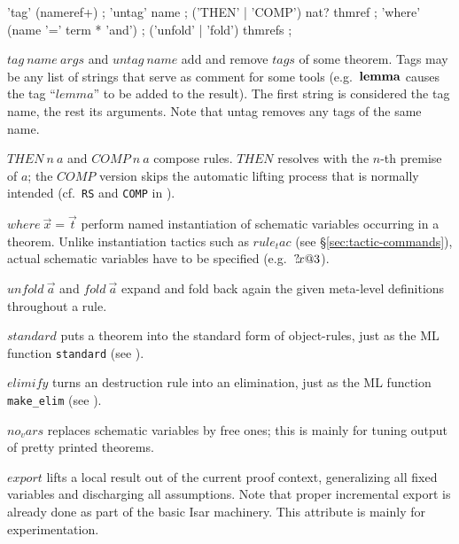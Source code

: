 \begin{rail}
  'tag' (nameref+)
  ;
  'untag' name
  ;
  ('THEN' | 'COMP') nat? thmref
  ;
  'where' (name '=' term * 'and')
  ;
  ('unfold' | 'fold') thmrefs
  ;
\end{rail}

\begin{descr}
\item [$tag~name~args$ and $untag~name$] add and remove $tags$ of some
  theorem.  Tags may be any list of strings that serve as comment for some
  tools (e.g.\ ${\mathord{\mathbf{lemma}}}$ causes the tag ``$lemma$'' to be added to the
  result).  The first string is considered the tag name, the rest its
  arguments.  Note that untag removes any tags of the same name.
\item [$THEN~n~a$ and $COMP~n~a$] compose rules.  $THEN$ resolves with the
  $n$-th premise of $a$; the $COMP$ version skips the automatic lifting
  process that is normally intended (cf.\ \texttt{RS} and \texttt{COMP} in
  \cite[\S5]{isabelle-ref}).
\item [$where~\vec x = \vec t$] perform named instantiation of schematic
  variables occurring in a theorem.  Unlike instantiation tactics such as
  $rule_tac$ (see \S\ref{sec:tactic-commands}), actual schematic variables
  have to be specified (e.g.\ ${?\!x@3}$).

\item [$unfold~\vec a$ and $fold~\vec a$] expand and fold back again the given
  meta-level definitions throughout a rule.

\item [$standard$] puts a theorem into the standard form of object-rules, just
  as the ML function \texttt{standard} (see \cite[\S5]{isabelle-ref}).

\item [$elimify$] turns an destruction rule into an elimination, just as the
  ML function \texttt{make\_elim} (see \cite{isabelle-ref}).

\item [$no_vars$] replaces schematic variables by free ones; this is mainly
  for tuning output of pretty printed theorems.

\item [$export$] lifts a local result out of the current proof context,
  generalizing all fixed variables and discharging all assumptions.  Note that
  proper incremental export is already done as part of the basic Isar
  machinery.  This attribute is mainly for experimentation.

\end{descr}


